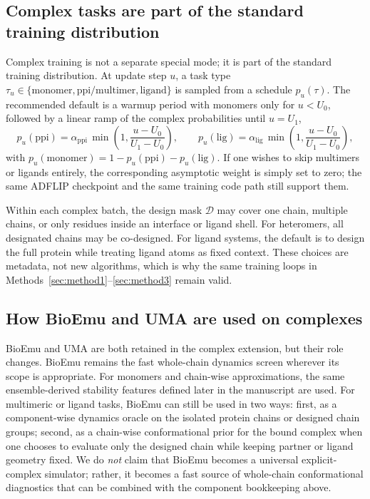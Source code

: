 \documentclass[11pt]{article}
\begin{document}
	\subsection{Complex tasks are part of the standard training distribution}
	
	Complex training is not a separate special mode; it is part of the standard training distribution. At update step $u$, a task type $\tau_u\in\{\text{monomer},\text{ppi/multimer},\text{ligand}\}$ is sampled from a schedule $p_u(\tau)$. The recommended default is a warmup period with monomers only for $u<U_0$, followed by a linear ramp of the complex probabilities until $u=U_1$,
	\begin{equation}
		p_u(\text{ppi}) = \alpha_{\mathrm{ppi}}\,\min\!\left(1,\frac{u-U_0}{U_1-U_0}\right), \qquad
		p_u(\text{lig}) = \alpha_{\mathrm{lig}}\,\min\!\left(1,\frac{u-U_0}{U_1-U_0}\right),
	\end{equation}
	with $p_u(\text{monomer})=1-p_u(\text{ppi})-p_u(\text{lig})$. If one wishes to skip multimers or ligands entirely, the corresponding asymptotic weight is simply set to zero; the same ADFLIP checkpoint and the same training code path still support them.
	
	Within each complex batch, the design mask $\mathcal{D}$ may cover one chain, multiple chains, or only residues inside an interface or ligand shell. For heteromers, all designated chains may be co-designed. For ligand systems, the default is to design the full protein while treating ligand atoms as fixed context. These choices are metadata, not new algorithms, which is why the same training loops in Methods~\ref{sec:method1}--\ref{sec:method3} remain valid.
	
	\subsection{How BioEmu and UMA are used on complexes}
	
	BioEmu and UMA are both retained in the complex extension, but their role changes. BioEmu remains the fast whole-chain dynamics screen wherever its scope is appropriate. For monomers and chain-wise approximations, the same ensemble-derived stability features defined later in the manuscript are used. For multimeric or ligand tasks, BioEmu can still be used in two ways: first, as a component-wise dynamics oracle on the isolated protein chains or designed chain groups; second, as a chain-wise conformational prior for the bound complex when one chooses to evaluate only the designed chain while keeping partner or ligand geometry fixed. We do \emph{not} claim that BioEmu becomes a universal explicit-complex simulator; rather, it becomes a fast source of whole-chain conformational diagnostics that can be combined with the component bookkeeping above.
	
\end{document}

